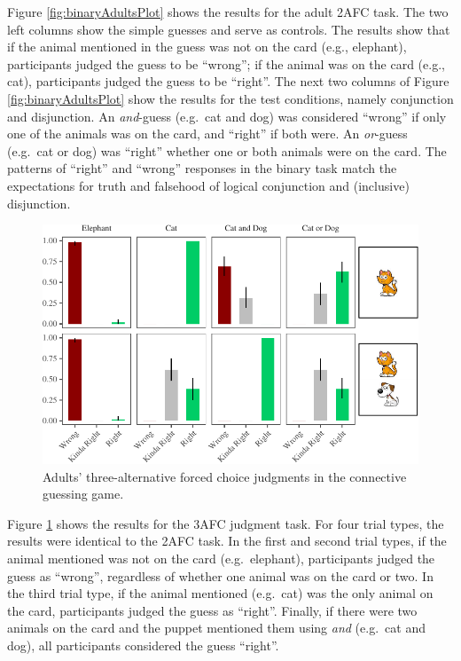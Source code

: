 \documentclass[floatsintext,man]{apa6}
\theoremstyle{definition}
\theoremstyle{definition}
\theoremstyle{definition}
\theoremstyle{remark}
\begin{document}
Figure \ref{fig:binaryAdultsPlot} shows the results for the adult 2AFC
task. The two left columns show the simple guesses and serve as
controls. The results show that if the animal mentioned in the guess was
not on the card (e.g., elephant), participants judged the guess to be
\enquote{wrong}; if the animal was on the card (e.g., cat), participants
judged the guess to be \enquote{right}. The next two columns of Figure
\ref{fig:binaryAdultsPlot} show the results for the test conditions,
namely conjunction and disjunction. An \emph{and}-guess (e.g.~cat and
dog) was considered \enquote{wrong} if only one of the animals was on
the card, and \enquote{right} if both were. An \emph{or}-guess (e.g.~cat
or dog) was \enquote{right} whether one or both animals were on the
card. The patterns of \enquote{right} and \enquote{wrong} responses in
the binary task match the expectations for truth and falsehood of
logical conjunction and (inclusive) disjunction.

\begin{figure}
\centering
\includegraphics{figs/ternaryAdultsPlot-1.pdf}
\caption{\label{fig:ternaryAdultsPlot}Adults' three-alternative forced
choice judgments in the connective guessing game.}
\end{figure}

Figure \ref{fig:ternaryAdultsPlot} shows the results for the 3AFC
judgment task. For four trial types, the results were identical to the
2AFC task. In the first and second trial types, if the animal mentioned
was not on the card (e.g.~elephant), participants judged the guess as
\enquote{wrong}, regardless of whether one animal was on the card or
two. In the third trial type, if the animal mentioned (e.g.~cat) was the
only animal on the card, participants judged the guess as
\enquote{right}. Finally, if there were two animals on the card and the
puppet mentioned them using \emph{and} (e.g.~cat and dog), all
participants considered the guess \enquote{right}.
\end{document}
